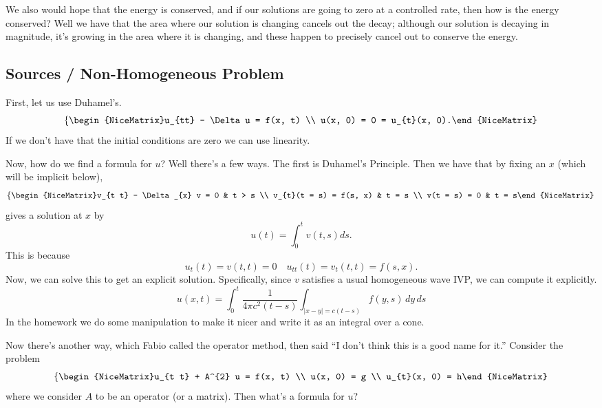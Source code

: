 We also would hope that the energy is conserved, and if our solutions are going to zero at a controlled rate, then how is the energy conserved? Well we have that the area where our solution is changing cancels out the decay; although our solution is decaying in magnitude, it's growing in the area where it is changing, and these happen to precisely cancel out to conserve the energy.

\subsection{Sources / Non-Homogeneous Problem}
First, let us use Duhamel's.
\[ \left\{\begin{NiceMatrix}u_{tt} - \Delta u = f(x, t) \\ u(x, 0) = 0 = u_{t}(x, 0).\end{NiceMatrix}\right.  \]
If we don't have that the initial conditions are zero we can use linearity.

Now, how do we find a formula for \( u \)? Well there's a few ways. The first is Duhamel's Principle. Then we have that by fixing an \( x \) (which will be implicit below),
\[ \left\{\begin{NiceMatrix}v_{t t} - \Delta_{x} v = 0 & t > s \\ v_{t}(t = s) = f(s, x) & t = s \\ v(t = s) = 0 & t = s\end{NiceMatrix}\right.  \]
gives a solution at \( x \) by
\[ u(t) = \int_{0}^{t}  v(t, s) ds. \]
This is because
\[ u_{t}(t) = v(t, t) = 0 \quad u_{t t}(t) = v_{t}(t, t) = f(s, x). \]
Now, we can solve this to get an explicit solution. Specifically, since \( v \) satisfies a usual homogeneous wave IVP, we can compute it explicitly.
\[ u(x, t) = \int_{0}^{t} \frac{1}{4 \pi c^{2} (t - s)} \int_{|x - y| = c(t - s)} f(y, s) \, dy \, ds  \]
In the homework we do some manipulation to make it nicer and write it as an integral over a cone.

Now there's another way, which Fabio called the operator method, then said ``I don't think this is a good name for it.'' Consider the problem
\[ \left\{\begin{NiceMatrix}u_{t t} + A^{2} u = f(x, t) \\ u(x, 0) = g \\ u_{t}(x, 0) = h\end{NiceMatrix}\right.  \]
where we consider \( A \) to be an operator (or a matrix). Then what's a formula for \( u \)? 

